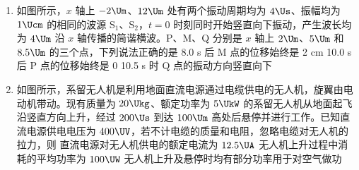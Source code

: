 \documentclass[\gkver]{gaokaozhenti}
\begin{document}
\begin{enumerate}
{B．根据能量关系可知 $m_{n}c^{2}=1876.1+2809.5-3728.4-17.6$，解得 $m_{n}=939.6\UMeV/c^{2}$，选项 B 正确；

C．太阳每秒放出的能量 $E=Pt=4\times10^{26}\UJ$，损失的质量 $\Delta m=\frac{E}{c^{2}}=\frac{4\times10^{26}}{9\times10^{16}}\Ukg\approx4.4\times10^{9}\Ukg$，选项 C 正确；

D．因为 $E=4\times10^{26}\UJ=\frac{4\times10^{26}}{1.6\times10^{-19}}\UeV=2.5\times10^{45}\UeV=2.5\times10^{39}\UMeV$，则太阳每秒因为辐射损失的质量为 $\Delta m=\frac{E}{c^{2}}=2.5\times10^{39}\UMeV/c^{2}$，选项 D 错误。

故选 BC。
}

\item
如图所示，$x$ 轴上 $-2\Um$、$12\Um$ 处有两个振动周期均为 $4\Us$、振幅均为 $1\Ucm$ 的相同的波源 S$_{1}$、S$_{2}$，$t=0$ 时刻同时开始竖直向下振动，产生波长均为 $4\Um$ 沿 $x$ 轴传播的简谐横波。P、M、Q 分别是 $x$ 轴上 $2\Um$、$5\Um$ 和 $8.5\Um$ 的三个点，下列说法正确的是
\onepicture[w=8.0cm]{}
{8.0 s 后 M 点的位移始终是 2 cm}
{10.0 s 后 P 点的位移始终是 0}
{10.5 s 时 Q 点的振动方向竖直向下}

\item
如图所示，系留无人机是利用地面直流电源通过电缆供电的无人机，旋翼由电动机带动。现有质量为 $20\Ukg$、额定功率为 $5\UkW$ 的系留无人机从地面起飞沿竖直方向上升，经过 $200\Us$ 到达 $100\Um$ 高处后悬停并进行工作。已知直流电源供电电压为 $400\UV$，若不计电缆的质量和电阻，忽略电缆对无人机的拉力，则
{直流电源对无人机供电的额定电流为 $12.5\UA$}
{无人机上升过程中消耗的平均功率为 $100\UW$}
{无人机上升及悬停时均有部分功率用于对空气做功}
\end{enumerate}
\end{document}
